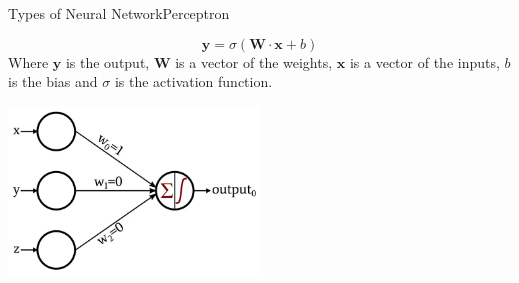 \documentclass{beamer}
\begin{document}
\begin{frame}{Types of Neural Network}{Perceptron}
\begin{multicols}{2}
    \begin{equation}
        \textbf{y} = \sigma(\textbf{W}\cdot\textbf{x} + b)
    \end{equation}
    Where $\textbf{y}$ is the output, $\textbf{W}$ is a vector of the weights, $\textbf{x}$ is a vector of the inputs, $b$ is the bias and $\sigma$ is the activation function.
    \begin{center}
        \includegraphics[width=0.5\textwidth]{images/perceptron}
    \end{center}
\end{multicols}
\end{frame}
\end{document}
